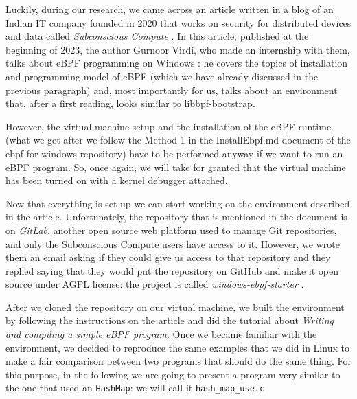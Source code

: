 Luckily, during our research, we came across an article written in a blog of an Indian IT company founded in 2020 that works on security for distributed devices and data called \textit{Subconscious Compute} \cite{SubComWebsite}.
In this article, published at the beginning of 2023, the author Gurnoor Virdi, who made an internship with them, talks about eBPF programming on Windows \cite{eBPFWinSubComBlogArticle}: he covers the topics of installation and programming model of eBPF (which we have already discussed in the previous paragraph) and, most importantly for us, talks about an environment that, after a first reading, looks similar to libbpf-bootstrap.

However, the virtual machine setup and the installation of the eBPF runtime (what we get after we follow the Method 1 in the InstallEbpf.md document of the ebpf-for-windows repository) have to be performed anyway if we want to run an eBPF program.
So, once again, we will take for granted that the virtual machine has been turned on with a kernel debugger attached.

Now that everything is set up we can start working on the environment described in the article.
Unfortunately, the repository that is mentioned in the document is on \textit{GitLab}, another open source web platform used to manage Git repositories, and only the Subconscious Compute users have access to it.
However, we wrote them an email asking if they could give us access to that repository and they replied saying that they would put the repository on GitHub and make it open source under AGPL license: the project is called \textit{windows-ebpf-starter} \cite{WineBPFStarterRepo}.

After we cloned the repository on our virtual machine, we built the environment by following the instructions on the article and did the tutorial about \textit{Writing and compiling a simple eBPF program}.
Once we became familiar with the environment, we decided to reproduce the same examples that we did in Linux to make a fair comparison between two programs that should do the same thing.
For this purpose, in the following we are going to present a program very similar to the one that used an \colorbox{backcolour}{\lstinline[style=commandline, language=bash, breaklines=true]|HashMap|}: we will call it \colorbox{backcolour}{\lstinline[style=commandline, language=bash, breaklines=true]|hash_map_use.c|}

